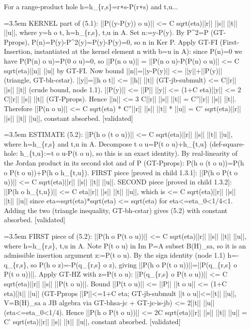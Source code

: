 \documentclass{article}
\newcommand{\step}[1]{\par\noindent\hangindent=3.5em\hangafter=1%
  \makebox[3.5em][l]{\textbf{#1.}}}
\newcommand{\steptag}[1]{\hfill{\small\textsf{[#1]}}}
\begin{document}
\begin{proofbox}{For a range-product hole h=h\_\{r,s\}=r∘s-P(r∘s) and t,u...}
\step{1.2.2} KERNEL part of (5.1): ||P((y-P(y)) o u)|| <= C sqrt(eta)||r|| ||s|| ||t|| ||u||, where y=h o t, h=h\_\{r,s\}, t,u in A. Set n:=y-P(y). By P\textasciicircum{}2=P (GT-Pprops), P(n)=P(y)-P\textasciicircum{}2(y)=P(y)-P(y)=0, so n in Ker P. Apply GT-FI (First-Insertion, instantiated at the kernel element n with b=u in A): since P(n)=0 we have P(P(n) o u)=P(0 o u)=0, so ||P(n o u)|| = ||P(n o u)-P(P(n) o u)|| <= C sqrt(eta)||n|| ||u|| by GT-FI. Now bound ||n||=||y-P(y)|| <= ||y||+||P(y)|| (triangle, GT-bh-cstar). ||y||=||h o t|| <= ||h|| ||t|| (GT-jb-submult) <= C||r|| ||s|| ||t|| (crude bound, node 1.1). ||P(y)|| <= ||P|| ||y|| <= (1+C eta)||y|| <= 2 C||r|| ||s|| ||t|| (GT-Pprops). Hence ||n|| <= 3 C||r|| ||s|| ||t|| = C''||r|| ||s|| ||t||. Therefore ||P(n o u)|| <= C sqrt(eta) * C''||r|| ||s|| ||t|| * ||u|| = C' sqrt(eta)||r|| ||s|| ||t|| ||u||, constant absorbed. \steptag{validated} \\[4pt]
\step{1.3} ESTIMATE (5.2): ||P(h o (t o u))|| <= C sqrt(eta)||r|| ||s|| ||t|| ||u||, where h=h\_\{r,s\} and t,u in A. Decompose t o u=P(t o u)+h\_\{t,u\} (def-square-hole: h\_\{t,u\}:=t o u-P(t o u), so this is an exact identity). By real-linearity of the Jordan product in its second slot and of P (GT-Pprops): P(h o (t o u))=P(h o P(t o u))+P(h o h\_\{t,u\}). FIRST piece [proved in child 1.3.1]: ||P(h o P(t o u))|| <= C sqrt(eta)||r|| ||s|| ||t|| ||u||. SECOND piece [proved in child 1.3.2]: ||P(h o h\_\{t,u\})|| <= C eta||r|| ||s|| ||t|| ||u||, which is <= C sqrt(eta)||r|| ||s|| ||t|| ||u|| since eta=sqrt(eta)*sqrt(eta) <= sqrt(eta) for eta<=eta\_0<1/4<1. Adding the two (triangle inequality, GT-bh-cstar) gives (5.2) with constant absorbed. \steptag{validated} \\[6pt]
\step{1.3.1} FIRST piece of (5.2): ||P(h o P(t o u))|| <= C sqrt(eta)||r|| ||s|| ||t|| ||u||, where h=h\_\{r,s\}, t,u in A. Note P(t o u) in Im P=A subset B(H)\_sa, so it is an admissible insertion argument z:=P(t o u). By the sign identity (node 1.1) h=-q\_\{r,s\}, so P(h o z)=-P(q\_\{r,s\} o z), giving ||P(h o P(t o u))||=||P(q\_\{r,s\} o P(t o u))||. Apply GT-HZ with z=P(t o u): ||P(q\_\{r,s\} o P(t o u))|| <= C sqrt(eta)||r|| ||s|| ||P(t o u)||. Bound ||P(t o u)|| <= ||P|| ||t o u|| <= (1+C eta)||t|| ||u|| (GT-Pprops ||P||<=1+C eta; GT-jb-submult ||t o u||<=||t|| ||u||, V=B(H)\_sa a JB algebra via GT-bhsa-jc + GT-jc-is-jb) <= 2||t|| ||u|| (eta<=eta\_0<1/4). Hence ||P(h o P(t o u))|| <= 2C sqrt(eta)||r|| ||s|| ||t|| ||u|| = C' sqrt(eta)||r|| ||s|| ||t|| ||u||, constant absorbed. \steptag{validated} \\[4pt]

\end{proofbox}
\end{document}
